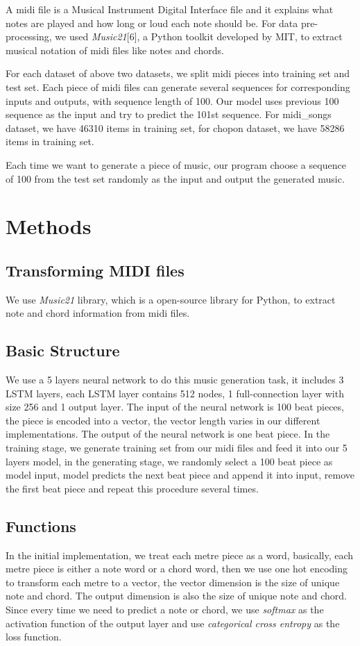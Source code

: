 \documentclass[conference]{IEEEtran}
\begin{document}
A midi file is a Musical Instrument Digital Interface file and it explains what notes are played and how long or loud each note should be. For data pre-processing, we used \textit{Music21}[6], a Python toolkit developed by MIT, to extract musical notation of midi files like notes and chords.

For each dataset of above two datasets, we split midi pieces into training set and test set. Each piece of midi files can generate several sequences for corresponding inputs and outputs, with sequence length of 100. Our model uses previous 100 sequence as the input and try to predict the 101st sequence. For midi\_songs dataset, we have 46310 items in training set, for chopon dataset, we have 58286 items in training set.

Each time we want to generate a piece of music, our program choose a sequence of 100 from the test set randomly as the input and output the generated music.

\section{Methods}

\subsection{Transforming MIDI files}
We use \textit{Music21} library, which is a open-source library for Python, to extract note and chord information from midi files.

\subsection{Basic Structure}
We use a 5 layers neural network to do this music generation task, it includes 3 LSTM layers, each LSTM layer contains 512 nodes, 1 full-connection layer with size 256 and 1 output layer. The input of the neural network is 100 beat pieces, the piece is encoded into a vector, the vector length varies in our different implementations. The output of the neural network is one beat piece. In the training stage, we generate training set from our midi files and feed it into our 5 layers model, in the generating stage, we randomly select a 100 beat piece as model input, model predicts the next beat piece and append it into input, remove the first beat piece and repeat this procedure several times.

\subsection{Functions}
In the initial implementation, we treat each metre piece as a word, basically, each metre piece is either a note word or a chord word, then we use one hot encoding to transform each metre to a vector, the vector dimension is the size of unique note and chord. The output dimension is also the size of unique note and chord. Since every time we need to predict a note or chord, we use \textit{softmax} as the activation function of the output layer and use \textit{categorical cross entropy} as the loss function.
\end{document}
